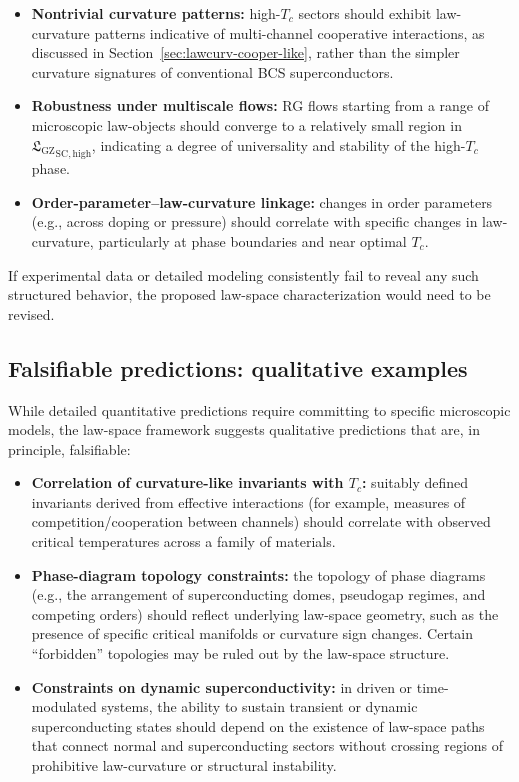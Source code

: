 \documentclass[11pt]{book}
\newcommand{\GZLS}{\ensuremath{\mathfrak{L}_{\mathrm{GZ}}}}
\theoremstyle{plain}
\theoremstyle{definition}
\theoremstyle{remark}
\begin{document}
\begin{itemize}
  \item \textbf{Nontrivial curvature patterns:}
        high-$T_c$ sectors should exhibit law-curvature patterns
        indicative of multi-channel cooperative interactions, as
        discussed in Section~\ref{sec:lawcurv-cooper-like}, rather
        than the simpler curvature signatures of conventional BCS
        superconductors.
  \item \textbf{Robustness under multiscale flows:}
        RG flows starting from a range of microscopic law-objects
        should converge to a relatively small region in
        ${\GZLS}_{\mathrm{SC,high}}$, indicating a degree of
        universality and stability of the high-$T_c$ phase.
  \item \textbf{Order-parameter–law-curvature linkage:}
        changes in order parameters (e.g., across doping or pressure)
        should correlate with specific changes in law-curvature,
        particularly at phase boundaries and near optimal $T_c$.
\end{itemize}

If experimental data or detailed modeling consistently fail to
reveal any such structured behavior, the proposed law-space
characterization would need to be revised.

\subsection*{Falsifiable predictions: qualitative examples}

While detailed quantitative predictions require committing to
specific microscopic models, the law-space framework suggests
qualitative predictions that are, in principle, falsifiable:

\begin{itemize}
  \item \textbf{Correlation of curvature-like invariants with
        $T_c$:}
        suitably defined invariants derived from effective
        interactions (for example, measures of competition/cooperation
        between channels) should correlate with observed critical
        temperatures across a family of materials.
  \item \textbf{Phase-diagram topology constraints:}
        the topology of phase diagrams (e.g., the arrangement of
        superconducting domes, pseudogap regimes, and competing
        orders) should reflect underlying law-space geometry, such
        as the presence of specific critical manifolds or curvature
        sign changes. Certain ``forbidden'' topologies may be ruled
        out by the law-space structure.
  \item \textbf{Constraints on dynamic superconductivity:}
        in driven or time-modulated systems, the ability to sustain
        transient or dynamic superconducting states should depend on
        the existence of law-space paths that connect normal and
        superconducting sectors without crossing regions of
        prohibitive law-curvature or structural instability.
\end{itemize}
\end{document}
